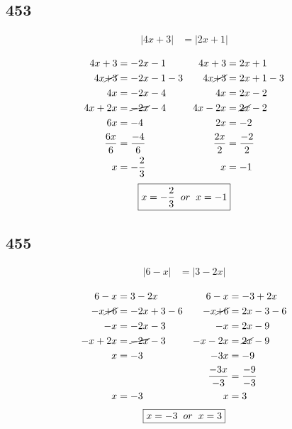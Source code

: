 \documentclass{article}
\begin{document}
    \subsection*{453}
    \begin{align*}
        |4x + 3| &= |2x + 1| \\
    \end{align*}
    \begin{align*}
        4x + 3 &= -2x - 1 &4x + 3 &= 2x + 1\\
        4x \cancel{+ 3} &= -2x - 1 - 3 &4x \cancel{+3} &= 2x + 1 -3\\
        4x  &=  -2x - 4 &4x  &= 2x - 2\\
        4x  +2x &=  \cancel{-2x} - 4 &4x -2x &= \cancel{2x} - 2\\
        6x & = -4 &2x &= -2\\
        \frac{6x}{6} &= \frac{-4}{6} &\frac{2x}{2} &= \frac{-2}{2} \\
        x &= -\frac{2}{3} &x &=-1\\
    \end{align*}
    \begin{align*}
        \boxed{x = -\frac{2}{3}\hspace{.2cm}or\hspace{.2cm}  x = -1}
    \end{align*}

    \subsection*{455}
    \begin{align*}
        |6 - x| &= |3 - 2x| \\
    \end{align*}
    \begin{align*}
        6 - x &= 3 - 2x &6 - x &= -3 + 2x\\
        -x \cancel{+ 6} &= -2x + 3 -6 &-x \cancel{+6} &= 2x -3 - 6\\
        -x  &=  -2x - 3 &-x  &= 2x - 9\\
        -x + 2x  &=  \cancel{-2x} - 3 &-x - 2x &= \cancel{2x} - 9\\
        x &= -3 &-3x &=-9\\
        &&\frac{-3x}{-3} &= \frac{-9}{-3} \\
        x &= -3 &x &=3\\
    \end{align*}
    \begin{align*}
        \boxed{x = -3\hspace{.2cm}or\hspace{.2cm}  x = 3}
    \end{align*}
\end{document}
